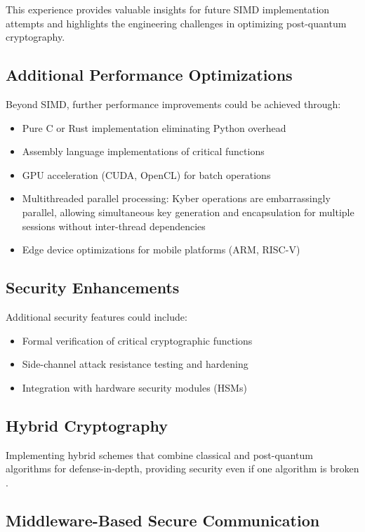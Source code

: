 This experience provides valuable insights for future SIMD implementation attempts and highlights the engineering challenges in optimizing post-quantum cryptography.

\subsection{Additional Performance Optimizations}

Beyond SIMD, further performance improvements could be achieved through:
\begin{itemize}
\item Pure C or Rust implementation eliminating Python overhead
\item Assembly language implementations of critical functions
\item GPU acceleration (CUDA, OpenCL) for batch operations
\item Multithreaded parallel processing: Kyber operations are embarrassingly parallel, allowing simultaneous key generation and encapsulation for multiple sessions without inter-thread dependencies
\item Edge device optimizations for mobile platforms (ARM, RISC-V)
\end{itemize}

\subsection{Security Enhancements}

Additional security features could include:
\begin{itemize}
\item Formal verification of critical cryptographic functions
\item Side-channel attack resistance testing and hardening
\item Integration with hardware security modules (HSMs)
\end{itemize}

\subsection{Hybrid Cryptography}

Implementing hybrid schemes that combine classical and post-quantum algorithms for defense-in-depth, providing security even if one algorithm is broken \cite{Paquin2020}.

\subsection{Middleware-Based Secure Communication}

